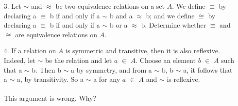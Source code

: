 \documentclass[11pt]{amsbook}
\begin{document}

\begin{enumerate}
	\item[3.] Let $\sim$ and $\approx$ be two equivalence relations on a set $A$. We define $\equiv$
 	by declaring a $\equiv$ b if and only if a $\sim$ b and a $\approx$ b; and we define $\cong$ by declaring 
	a $\cong$ b if and only if a $\sim$ b or a $\approx$ b. Determine whether $\equiv$ and  $\cong$ are
	equivalence relations on $A$. \\
	\item[4.] If a relation on $A$ is symmetric and transitive, then it is also reflexive. Indeed, let $\sim$ be the relation
	and let  $a$ $\in$ $A$. Choose an element $b$ $\in$ $A$ such that a $\sim$ b. Then b $\sim$ a by symmetry, and
	from a $\sim$ b, b $\sim$ a, it follows that a $\sim$ a, by transitivity. So a $\sim$ a for any $a$ $\in$ $A$ and
	$\sim$ is reflexive. \\ \\
	This argument is wrong. Why?
 \end{enumerate}
\end{document}
